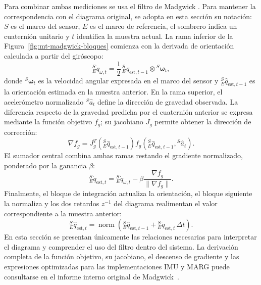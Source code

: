 Para combinar ambas mediciones se usa el filtro de Madgwick \cite{Madgwick2010}. Para mantener la
correspondencia con el diagrama original, se adopta en esta sección su notación: $S$ es el
marco del sensor, $E$ es el marco de referencia, el sombrero indica un cuaternión unitario y
$t$ identifica la muestra actual. La rama inferior de la
Figura~\ref{fig:mt-madgwick-bloques} comienza con la derivada de orientación calculada a
partir del giróscopo:
\begin{equation}
  {}^S_E\dot{q}_{\omega,t} =
  \frac{1}{2}\,{}^S_E\hat{q}_{\mathrm{est},t-1}
  \otimes {}^S\!\boldsymbol{\omega}_t,
  \label{eq:quat-gyro-prop}
\end{equation}
donde ${}^S\!\boldsymbol{\omega}_t$ es la velocidad angular expresada en el marco del sensor y
${}^S_E\hat{q}_{\mathrm{est},t-1}$ es la orientación estimada en la muestra anterior. En la
rama superior, el acelerómetro normalizado ${}^S\hat{a}_t$ define la dirección de gravedad
observada. La diferencia respecto de la gravedad predicha por el cuaternión anterior se
expresa mediante la función objetivo $f_g$; su jacobiano $J_g$ permite obtener la dirección
de corrección:
\begin{equation}
  \nabla f_g =
  J_g^{T}\!\left({}^S_E\hat{q}_{\mathrm{est},t-1}\right)
  f_g\!\left({}^S_E\hat{q}_{\mathrm{est},t-1},{}^S\hat{a}_t\right).
  \label{eq:madgwick-gradient}
\end{equation}
El sumador central combina ambas ramas restando el gradiente normalizado, ponderado por la
ganancia $\beta$:
\begin{equation}
  {}^S_E\dot{q}_{\mathrm{est},t} =
  {}^S_E\dot{q}_{\omega,t}
  -\beta\frac{\nabla f_g}{\lVert\nabla f_g\rVert}.
  \label{eq:madgwick-corrected-rate}
\end{equation}
Finalmente, el bloque de integración actualiza la orientación, el bloque siguiente la
normaliza y los dos retardos $z^{-1}$ del diagrama realimentan el valor correspondiente a la
muestra anterior:
\begin{equation}
  {}^S_E\hat{q}_{\mathrm{est},t} =
  \operatorname{norm}\!\left(
  {}^S_E\hat{q}_{\mathrm{est},t-1}
  +{}^S_E\dot{q}_{\mathrm{est},t}\,\Delta t
  \right).
  \label{eq:madgwick-integration}
\end{equation}
En esta sección se presentan únicamente las relaciones necesarias para interpretar el
diagrama y comprender el uso del filtro dentro del sistema. La derivación completa de la
función objetivo, su jacobiano, el descenso de gradiente y las expresiones optimizadas para
las implementaciones IMU y MARG puede consultarse en el informe interno original de
Madgwick~\cite{MadgwickInternalReport2010}.

